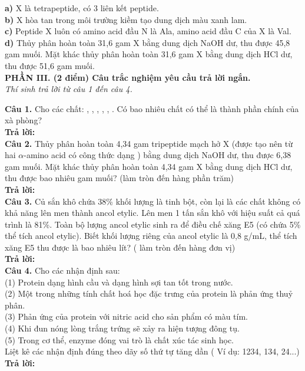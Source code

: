 \documentclass[11pt,a4paper]{article}
\begin{document}
\quad \textbf{a)} X là tetrapeptide, có 3 liên kết peptide.\\[2pt]
\quad \textbf{b)} X hòa tan  trong môi trường kiềm tạo dung dịch màu xanh lam.\\[2pt]
\quad \textbf{c)} Peptide X luôn có amino acid đầu N là Ala, amino acid đầu C của X là Val.\\[2pt]
\quad \textbf{d)} Thủy phân hoàn toàn 31,6 gam X bằng dung dịch NaOH dư, thu được 45,8 gam muối. Mặt khác thủy phân hoàn toàn 31,6 gam X bằng dung dịch HCl dư, thu được 51,6 gam muối.\\[2pt]

\vspace{4pt}
\noindent\textbf{\large\color{mainGreen}PHẦN III. (2 điểm) Câu trắc nghiệm yêu cầu trả lời ngắn.}\\
\textit{Thí sinh trả lời từ câu 1 đến câu 4.}
\vspace{4pt}

\textbf{Câu 1.} Cho các chất: , , , , , . Có bao nhiêu chất có thể là thành phần chính của xà phòng?\\[2pt]
\textbf{Trả lời:} \dotfill\\[4pt]
\vspace{2pt}
\textbf{Câu 2.} Thủy phân hoàn toàn 4,34 gam tripeptide mạch hở X (được tạo nên từ hai $\alpha$-amino acid có công thức dạng ) bằng dung dịch NaOH dư, thu được 6,38 gam muối. Mặt khác thủy phân hoàn toàn 4,34 gam X bằng dung dịch HCl dư, thu được bao nhiêu gam muối? (làm tròn đến hàng phần trăm)\\[2pt]
\textbf{Trả lời:} \dotfill\\[4pt]
\vspace{2pt}
\textbf{Câu 3.} Củ sắn khô chứa 38\% khối lượng là tinh bột, còn lại là các chất không có khả năng lên men thành ancol etylic. Lên men 1 tấn sắn khô với hiệu suất cả quá trình là 81\%. Toàn bộ lượng ancol etylic sinh ra để điều chế xăng E5 (có chứa 5\% thể tích ancol etylic). Biết khối lượng riêng của ancol etylic là 0,8 g/mL, thể tích xăng E5 thu được là bao nhiêu lít? ( làm tròn đến hàng đơn vị)\\[2pt]
\textbf{Trả lời:} \dotfill\\[4pt]
\vspace{2pt}
\textbf{Câu 4.} Cho các nhận định sau:\\
(1) Protein dạng hình cầu và dạng hình sợi tan tốt trong nước.\\
(2) Một trong những tính chất hoá học đặc trưng của protein là phản ứng thuỷ phân.\\
(3) Phản ứng của protein với nitric acid cho sản phẩm có màu tím.\\
(4) Khi đun nóng lòng trắng trứng sẽ xảy ra hiện tượng đông tụ.\\
(5) Trong cơ thể, enzyme đóng vai trò là chất xúc tác sinh học.\\
Liệt kê các nhận định đúng theo dãy số thứ tự tăng dần ( Ví dụ: 1234, 134, 24...)\\[2pt]
\textbf{Trả lời:} \dotfill\\[4pt]
\vspace{2pt}
\end{document}
